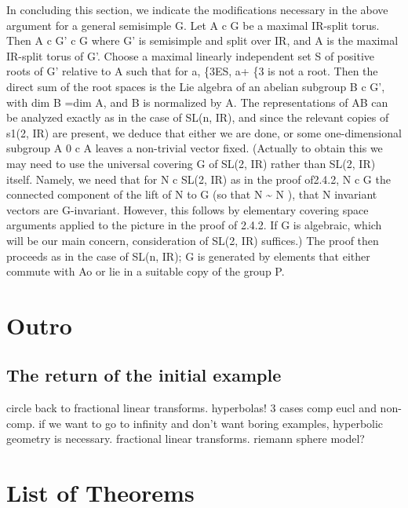 \documentclass[
  12pt
]{article}
\theoremstyle{break}
\theoremstyle{plain}
\begin{document}
   In concluding this section, we indicate the
  modifications necessary in the above argument for a general semisimple
  G. Let A c G be a maximal IR-split torus. Then A c G' c G where G' is
  semisimple and split over IR, and A is the maximal IR-split torus of G'.
  Choose a maximal linearly independent set S of positive roots of G'
  relative to A such that for a, \{3ES, a+ \{3 is not a root. Then the
  direct sum of the root spaces is the Lie algebra of an abelian subgroup
  B c G', with dim B =dim A, and B is normalized by A. The representations
  of AB can be analyzed exactly as in the case of SL(n, IR), and since the
  relevant copies of s1(2, IR) are present, we deduce that either we are
  done, or some one-dimensional subgroup A 0 c A leaves a non-trivial
  vector fixed. (Actually to obtain this we may need to use the universal
  covering G of SL(2, IR) rather than SL(2, IR) itself. Namely, we need
  that for N c SL(2, IR) as in the proof of2.4.2, N c G the connected
  component of the lift of N to G (so that N \textasciitilde{} N ), that N
  invariant vectors are G-invariant. However, this follows by elementary
  covering space arguments applied to the picture in the proof of 2.4.2.
  If G is algebraic, which will be our main concern, consideration of
  SL(2, IR) suffices.) The proof then proceeds as in the case of SL(n,
  IR); G is generated by elements that either commute with Ao or lie in a
  suitable copy of the group P.








\hypertarget{outro}{%
\section{Outro}\label{outro}}


  \hypertarget{return-of-the-initial-example}{%
  \subsection{The return of the initial example
  }\label{return-of-the-initial-example}}

  circle back to fractional linear transforms.
  hyperbolas! 3 cases comp eucl and non-comp. if we want to go to infinity
  and don't want boring examples, hyperbolic geometry is necessary.
  fractional linear transforms. riemann sphere model?









\cleardoublepage

\section{List of Theorems}

{}
\listoffigures

{}
\printbibliography
\end{document}
